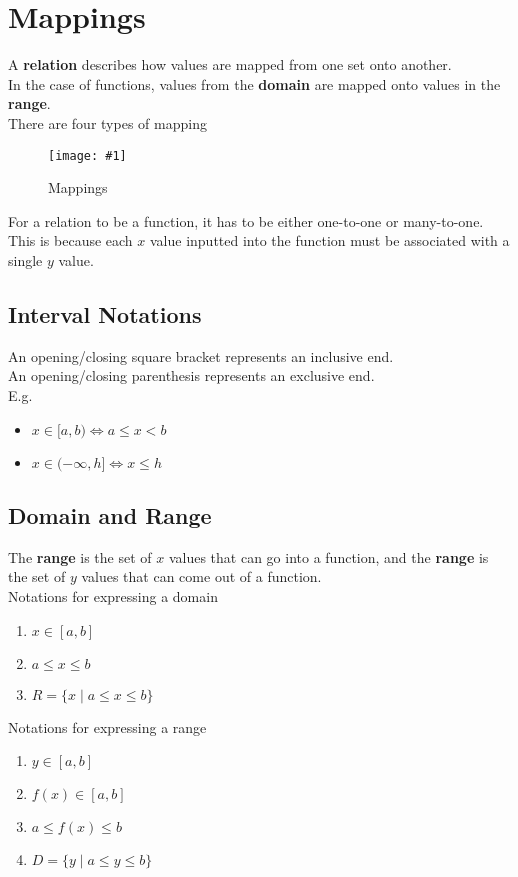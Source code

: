 \documentclass[11pt]{article}
\newcommand{\lb}{\\[8pt]}
\newcommand{\img}[3]{\begin{center}
  \begin{figure}[H]
    \centering
    \texttt{[image: \#1]}
    \caption{#3}
    \label{fig:fig1}
  \end{figure}
\end{center}}
\begin{document}
\pagebreak

\section{Mappings}

A \textbf{relation} describes how values are mapped from one set onto another.\lb
In the case of functions, values from the \textbf{domain} are mapped onto values in the \textbf{range}.\lb
There are four types of mapping
\img{figs/mapping.jpeg}{0.4}{Mappings}

\noindent For a relation to be a function, it has to be either one-to-one or many-to-one. This is because each $x$ value inputted into the function must be associated with a single $y$ value.


\subsection{Interval Notations}

An opening/closing square bracket represents an inclusive end.\lb
An opening/closing parenthesis represents an exclusive end.\lb
E.g.
\begin{itemize}
  \item $x\in [a, b) \iff a \le x < b$
  \item $x\in (-\infty, h] \iff x \le h$
\end{itemize}


\pagebreak


\subsection{Domain and Range}

The \textbf{range} is the set of $x$ values that can go into a function, and the \textbf{range} is the set of $y$ values that can come out of a function.\lb
Notations for expressing a domain
\begin{enumerate}
  \item $x\in [a, b]$
  \item $a \le x \le b$
  \item $R = \{x \mid a \le x \le b \}$
\end{enumerate}
Notations for expressing a range
\begin{enumerate}
  \item $y\in [a, b]$
  \item $f(x)\in [a, b]$
  \item $a \le f(x) \le b$
  \item $D = \{y \mid a \le y \le b \}$
\end{enumerate}
\end{document}
